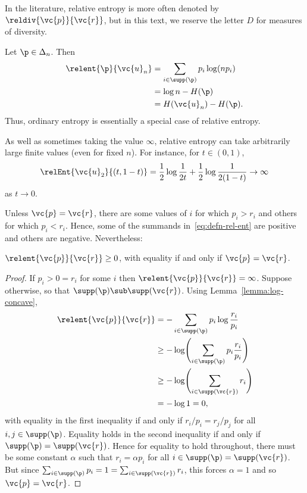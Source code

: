 In the literature, relative entropy is more often denoted by
$\reldiv{\vc{p}}{\vc{r}}$, but in this text, we reserve the letter $D$ for
measures of diversity.

\begin{example}
Let $\p \in \Delta_n$.  Then
% 
\begin{align*}
\relent{\p}{\vc{u}_n}   &
=
\sum_{i \in \supp(\p)} p_i \log(np_i)   \\
&
=
\log n - H(\p)  \\
&
=
H(\vc{u}_n) - H(\p).
\end{align*}
% 
Thus, ordinary entropy is essentially a special case of relative entropy.
\end{example}

\begin{example}
As well as sometimes taking the value $\infty$, relative entropy can take
arbitrarily large finite values (even for fixed $n$).  For instance, for $t
\in (0, 1)$, 
\[
\relEnt{\vc{u}_2}{(t, 1 - t)} 
=
\frac{1}{2} \log \frac{1}{2t} + \frac{1}{2} \log \frac{1}{2(1 - t)}
\to 
\infty
\]
as $t \to 0$.  
\end{example}

Unless $\vc{p} = \vc{r}$, there are some values of $i$ for which $p_i >
r_i$ and others for which $p_i < r_i$.  Hence, some of the summands
in~\eqref{eq:defn-rel-ent} are positive and others are negative.
Nevertheless:

\begin{lemma}
$\relent{\vc{p}}{\vc{r}} \geq 0$, with equality if and only if $\vc{p} =
  \vc{r}$. 
\end{lemma}

\begin{proof}
If $p_i > 0 = r_i$ for some $i$ then $\relent{\vc{p}}{\vc{r}} = \infty$.
Suppose otherwise, so that $\supp(\p) \sub \supp(\vc{r})$.  Using
Lemma~\ref{lemma:log-concave},
% 
\begin{align*}
\relent{\vc{p}}{\vc{r}} &
=
- \sum_{i \in \supp(\p)} p_i \log \frac{r_i}{p_i}       \\
&
\geq    
- \log \Biggl( \sum_{i \in \supp(\p)} p_i \frac{r_i}{p_i} \Biggr)       \\
&
\geq
- \log \Biggl( \sum_{i \in \supp(\vc{r})} r_i \Biggr)   \\
&
=
- \log 1 
=
0,
\end{align*}
% 
with equality in the first inequality if and only if $r_i/p_i = r_j/p_j$
for all $i, j \in \supp(\p)$.  Equality holds in the second inequality if
and only if $\supp(\p) = \supp(\vc{r})$.  Hence for equality to hold
throughout, there must be some constant $\alpha$ such that $r_i = \alpha
p_i$ for all $i \in \supp(\p) = \supp(\vc{r})$.  But since $\sum_{i \in
  \supp(\p)} p_i = 1 = \sum_{i \in \supp(\vc{r})} r_i$, this forces $\alpha
= 1$ and so $\vc{p} = \vc{r}$.
\end{proof}

